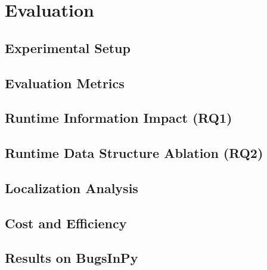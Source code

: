 \chapter{Evaluation}
\label{ch:evaluation}

\section{Experimental Setup}

\section{Evaluation Metrics}

\section{Runtime Information Impact (RQ1)}

\section{Runtime Data Structure Ablation (RQ2)}

\section{Localization Analysis}

\section{Cost and Efficiency}

\section{Results on BugsInPy}
